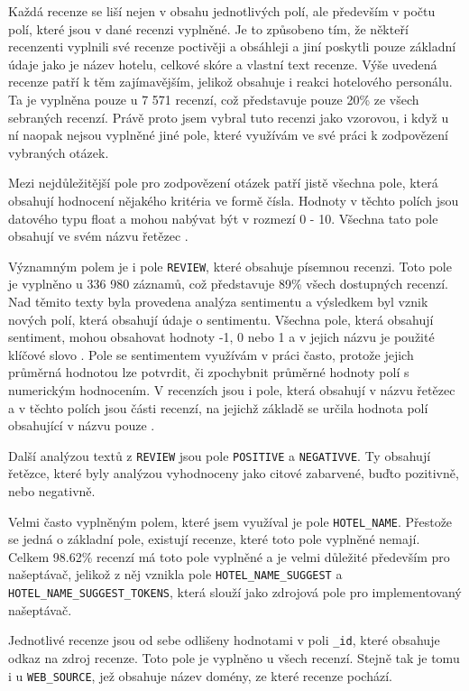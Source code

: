 \documentclass[czech,BP]{thesiskiv}
\begin{document}
Každá recenze se liší nejen v obsahu jednotlivých polí, ale především v počtu polí, které jsou v dané recenzi vyplněné. Je to způsobeno tím, že někteří recenzenti vyplnili své recenze poctivěji a obsáhleji a jiní poskytli pouze základní údaje jako je název hotelu, celkové skóre a vlastní text recenze. Výše uvedená recenze patří k těm zajímavějším, jelikož obsahuje i reakci hotelového personálu. Ta je vyplněna pouze u 7 571 recenzí, což představuje pouze 20\% ze všech sebraných recenzí. Právě proto jsem vybral tuto recenzi jako vzorovou, i když u ní naopak nejsou vyplněné jiné pole, které využívám ve své práci k zodpovězení vybraných otázek.


Mezi nejdůležitější pole pro zodpovězení otázek patří jistě všechna pole, která obsahují hodnocení nějakého kritéria ve formě čísla. Hodnoty v těchto polích jsou datového typu float a mohou nabývat být v rozmezí 0 - 10. Všechna tato pole obsahují ve svém názvu řetězec .


Významným polem je i pole \texttt{REVIEW}, které obsahuje písemnou recenzi. Toto pole je vyplněno u 336 980 záznamů, což představuje 89\% všech dostupných recenzí. Nad těmito texty byla provedena analýza sentimentu a výsledkem byl vznik nových polí, která obsahují údaje o sentimentu. Všechna pole, která obsahují sentiment, mohou obsahovat hodnoty -1, 0 nebo 1 a v jejich názvu je použité klíčové slovo . Pole se sentimentem využívám v práci často, protože jejich průměrná hodnotou lze potvrdit, či zpochybnit průměrné hodnoty polí s numerickým hodnocením. V recenzích jsou i pole, která obsahují v názvu řetězec  a v těchto polích jsou části recenzí, na  jejichž základě se určila hodnota polí obsahující v názvu pouze .

Další analýzou textů z \texttt{REVIEW} jsou pole \texttt{POSITIVE} a \texttt{NEGATIVVE}. Ty obsahují řetězce, které byly analýzou vyhodnoceny jako citové zabarvené, buďto pozitivně, nebo negativně.


Velmi často vyplněným polem, které jsem využíval je pole \texttt{HOTEL\_NAME}. Přestože se jedná o základní pole, existují recenze, které toto pole vyplněné nemají. Celkem 98.62\% recenzí má toto pole vyplněné a je velmi důležité především pro našeptávač, jelikož z něj vznikla pole \texttt{HOTEL\_NAME\_SUGGEST} a \texttt{HOTEL\_NAME\_SUGGEST\_TOKENS}, která slouží jako zdrojová pole pro implementovaný našeptávač.

Jednotlivé recenze jsou od sebe odlišeny hodnotami v poli \texttt{\_id}, které obsahuje odkaz na zdroj recenze. Toto pole je vyplněno u všech recenzí. Stejně tak je tomu i u \texttt{WEB\_SOURCE}, jež obsahuje název domény, ze které recenze pochází.
\end{document}
